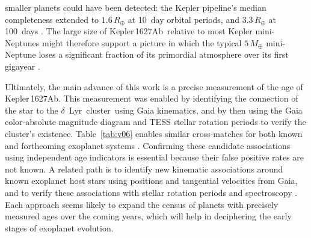 \documentclass[12pt,modern,twocolumn,tighten,linenumbers]{aastex63}
\newcommand{\cn}{$\delta$\ Lyr\ cluster} %
\newcommand{\sn}{Kepler\,1627} %
\newcommand{\pn}{Kepler\,1627Ab} %
\begin{document}
  smaller planets could have been
detected\added{ in the \sn\ system}: the Kepler pipeline's median completeness extended to
$1.6\,R_\oplus$ at 10~day orbital periods, and $3.3\,R_\oplus$ at
100~days
\citep{2021ascl.soft07027B}.
 The large size of \pn\ relative
to most Kepler mini-Neptunes might therefore support a picture
in which the typical $5\,M_\oplus$ mini-Neptune
\citep{wu_mass_2019} loses a significant fraction of its primordial
atmosphere over its first gigayear
\citep{Owen_Wu_2013,ginzburg_corepowered_2018}.  


Ultimately, the main advance of this work is a precise measurement of
the age of \pn.   This measurement was enabled by identifying the
connection of the star to the \cn\ using Gaia kinematics, and by then 
using the Gaia color-absolute magnitude diagram and TESS stellar
rotation periods to verify the cluster's existence.
Table~\ref{tab:v06} enables similar cross-matches for both known and
forthcoming exoplanet systems \citep[{\it
e.g.},][]{guerrero_tess_2021}. Confirming these candidate associations
using independent age indicators is essential because their false
positive rates are not known.  A related path is to identify new
kinematic associations around known exoplanet host stars using
positions and tangential velocities from Gaia, and to verify
these associations with stellar rotation periods and spectroscopy
\citep[{\it e.g.},][]{tofflemire_tess_2021}.  Each approach seems
likely to expand the census of planets with precisely measured ages
over the coming years, which will help in deciphering the early stages
of exoplanet evolution.
\end{document}
